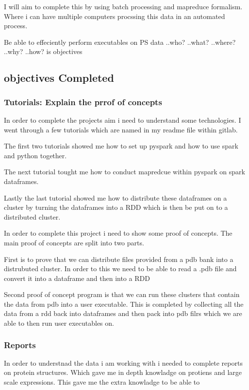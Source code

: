 \documentclass{report}
\begin{document}
I will aim to complete this by using batch processing and mapreduce formalism. Where i can have multiple computers procssing this data in an automated process. 

Be able to effeciently perform executables on PS data
..who?
..what?
..where?
..why?
..how? is objectives

\subsection{objectives Completed}

\subsubsection{Tutorials:
Explain the prrof of concepts}

In order to complete the projects aim i need to understand some technologies. I went through a few tutorials which are named in my readme file within gitlab. 

The first two tutorials showed me how to set up pyspark and how to use spark and python together. 

The next tutorial tought me how to conduct mapredcue within pyspark on spark dataframes.

Lastly the last tutorial showed me how to distribute these dataframes on a cluster by turning the dataframes into a RDD which is then be put on to a distributed cluster.

In order to complete this project i need to show some proof of concepts. The main proof of concepts are split into two parts.

First is to prove that we can distribute files provided from a pdb bank into a distrubuted cluster. In order to this we need to be able to read a .pdb file and convert it into a dataframe and then into a RDD

Second proof of concept program is that we can run these clusters that contain the data from pdb into a user executable. This is completed by collecting all the data from a rdd back into dataframes and then pack into pdb filrs which we are able to then run user executables on.


\subsubsection{Reports}


In order to understnad the data i am working with i needed to complete reports on protein structures. Which gave me in depth knowladge on protiens and large scale expressions. This gave me the extra knowladge to be able to
\end{document}
